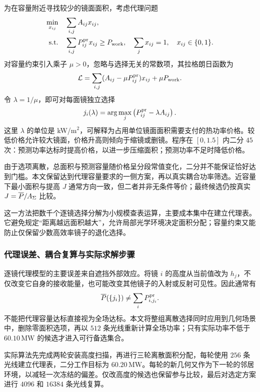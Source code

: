 为在容量附近寻找较少的镜面面积，考虑代理问题
\begin{align}
\min_{x_{ij}}\quad &\sum_{i,j} A_{ij}x_{ij},\\
\text{s.t.}\quad &\sum_{i,j}P_{ij}^{\rm pr}x_{ij}\ge P_{\rm work},\quad
\sum_jx_{ij}=1,\quad x_{ij}\in\{0,1\}.
\end{align}
对容量约束引入乘子 $\mu>0$，忽略与选择无关的常数项，其拉格朗日函数为
\begin{equation}
\mathcal L=\sum_{i,j}(A_{ij}-\mu P_{ij}^{\rm pr})x_{ij}+\mu P_{\rm work}.
\end{equation}
令 $\lambda=1/\mu$，即可对每面镜独立选择
\begin{equation}\label{eq:lambda}
j_i(\lambda)=\arg\max_j\left(P_{ij}^{\rm pr}-\lambda A_{ij}\right).
\end{equation}
这里 $\lambda$ 的单位是 kW/m$^2$，可解释为占用单位镜面面积需要支付的热功率价格。较低价格允许较大镜面，价格升高则倾向于缩镜或删镜。程序在 $[0,1.5]$ 内二分 $45$ 次：预测功率达标时提高价格，以进一步压缩面积；预测功率不足时降低价格。

由于选项离散，总面积与预测容量随价格呈分段常值变化，二分并不能保证恰好达到门槛。本文保留达到代理容量要求的一侧方案，再以真实耦合功率筛选。近容量下最小面积与提高 $J$ 通常方向一致，但二者并非无条件等价；最终候选仍按真实 $J=\overline{P}/A_\Sigma$ 比较。

这一方法把数千个逐镜选择分解为小规模查表运算，主要成本集中在建立代理表。它避免规定“距离越远面积越大”，允许局部光学环境决定面积分配；容量约束又能防止仅保留少数高效率镜子的退化选择。

\pagepart
\subsubsection{代理误差、耦合复算与实际求解步骤}
逐镜代理模型的主要误差来自遮挡外部效应。将镜 $i$ 的高度从当前值改为 $h_j$，不仅改变它自身的接收能量，也可能改变其他镜子的入射或反射可见性。因此通常有
\begin{equation}
\overline{P}(\{j_i\})\ne\sum_iP_{i,j_i}^{\rm pr}.
\end{equation}
不能把代理容量达标直接视为全场达标。本文将整组离散选择同时应用到几何场景中，删除零面积选项，再以 $512$ 条光线重新计算全场功率；只有实际功率不低于 $60.10\,\mathrm{MW}$ 的候选才进入可行备选集合。

实际算法先完成两轮安装高度扫描，再进行三轮离散面积分配，每轮使用 $256$ 条光线建立代理表，二分工作目标为 $60.20\,\mathrm{MW}$。每轮的新几何又作为下一轮的邻居环境，以减轻一次冻结的偏差。仅改高度的候选也保留参与比较，最后对选定方案进行 $4096$ 和 $16384$ 条光线复算。

